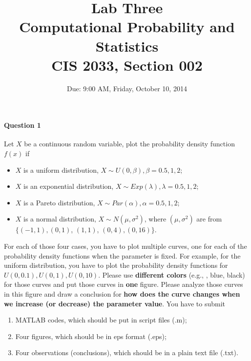 \documentclass[11pt]{article} %
\title{Lab Three\\
Computational Probability and Statistics \\
CIS 2033, Section 002}
\author{Due: 9:00 AM, Friday, October 10, 2014}
\date{} %
\begin{document}
\maketitle

\paragraph*{Question 1}
Let $X$ be a continuous random variable, plot the probability density function $f(x)$ if
\begin{itemize}
\item $X$ is a uniform distribution, $X \sim U(0, \beta), \beta = 0.5, 1, 2$; 
\item $X$ is an exponential distribution, $X \sim Exp(\lambda), \lambda = 0.5, 1, 2$;
\item $X$ is a Pareto distribution, $X \sim Par(\alpha), \alpha = 0.5, 1, 2$;
\item $X$ is a normal distribution, $X \sim N(\mu, \sigma^2)$, where $(\mu, \sigma^2)$ are from $\{(-1, 1), (0, 1)$, $(1, 1)$, $(0, 4), (0, 16)\}$.
\end{itemize}
For each of those four cases, you have to plot multiple curves, one for each of the probability density functions when the parameter is fixed. For example, for the uniform distribution, you have to plot the probability density functions for $U(0, 0.1), U(0, 1), U(0, 10)$. Please use {\bf different colors} (e.g., {\color{red}{red}}, {\color{blue}blue}, {\color{black}black}) for those curves and put those curves in {\bf one} figure. Please analyze those curves in this figure and draw a conclusion for {\bf how does the curve changes when we increase (or decrease) the parameter value}. 
You have to submit 
\begin{enumerate}
\item MATLAB codes, which should be put in script files (.m); 
\item Four figures, which should be in eps format (.eps);
\item Four observations (conclusions), which should be in a plain text file (.txt). 
\end{enumerate}
\end{document}
